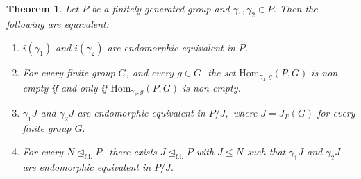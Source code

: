 \documentclass[10pt,a4paper]{amsart}
\newtheorem{theorem}{Theorem}
\begin{document}
\begin{theorem}\label{main}
    Let $P$ be a finitely generated group and $\gamma_1, \gamma_2 \in P.$ Then the following are equivalent:
    \begin{enumerate}
        \item $i(\gamma_1)$ and $i(\gamma_2)$ are endomorphic equivalent  in $\widehat{P}$.
        \item For every finite group $G$, and every $g \in G$, the set $\mathrm{Hom}_{\gamma_1,g}(P,G)$ is non-empty if and only if $\mathrm{Hom}_{\gamma_2,g}( P,G)$ is non-empty.
        \item $\gamma_1J$ and $\gamma_2J$ are endomorphic equivalent in $P/J,$ where $J= J_P(G)$ for every finite group $G.$
        \item For every $N \unlhd _\mathrm{f.i.}P,$ there exists $J \unlhd_\mathrm{f.i.} P$ with $J \leq N$ such that $\gamma_1J$ and $ \gamma_2J$ are endomorphic equivalent in $P/J.$
    \end{enumerate}
\end{theorem}
\end{document}
